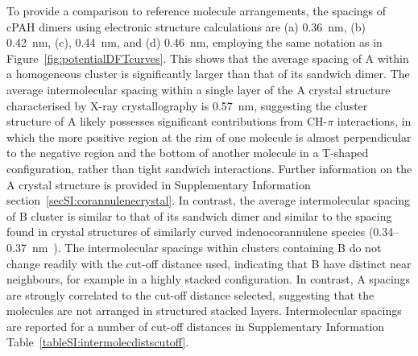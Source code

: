 To provide a comparison to reference molecule arrangements, the spacings of cPAH dimers using electronic structure calculations are (a) 0.36~nm, (b) 0.42~nm, (c), 0.44~nm, and (d) 0.46~nm, employing the same notation as in Figure~\ref{fig:potentialDFTcurves}. This shows that the average spacing of A within a homogeneous cluster is significantly larger than that of its sandwich dimer. The average intermolecular spacing within a single layer of the A crystal structure characterised by X-ray crystallography is 0.57~nm, suggesting the cluster structure of A likely possesses significant contributions from CH-$\pi$ interactions, in which the more positive region at the rim of one molecule is almost perpendicular to the negative region and the bottom of another molecule in a T-shaped configuration, rather than tight sandwich interactions. Further information on the A crystal structure is provided in Supplementary Information section~\ref{secSI:corannulenecrystal}. In contrast, the average intermolecular spacing of B cluster is similar to that of its sandwich dimer and similar to the spacing found in crystal structures of similarly curved indenocorannulene species (0.34--0.37~nm~\cite{Filatov2010}). The intermolecular spacings within clusters containing B do not change readily with the cut-off distance used, indicating that B have distinct near neighbours, for example in a highly stacked configuration. In contrast, A spacings are strongly correlated to the cut-off distance selected, suggesting that the molecules are not arranged in structured stacked layers. Intermolecular spacings are reported for a number of cut-off distances in Supplementary Information Table~\ref{tableSI:intermolecdistscutoff}.

